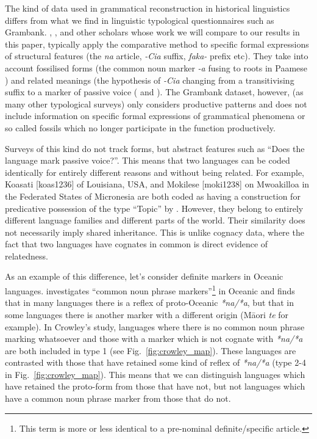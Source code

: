 \documentclass[a4paper,10pt]{article} %
\begin{document}
The kind of data used in grammatical reconstruction in historical linguistics differs from what we find in linguistic typological questionnaires such as Grambank. \citet{crowley1985common}, \citet{clark1976aspects}, and other scholars whose work we will compare to our results in this paper, typically apply the comparative method to specific formal expressions of structural features (the \emph{na} article, \emph{-Cia} suffix, \emph{faka-} prefix etc). They take into account fossilised forms (the common noun marker \emph{-a} fusing to roots in Paamese \citep[141]{crowley1985common}) and related meanings (the hypothesis of \emph{-Cia} changing from a transitivising suffix to a marker of passive voice (\citet{hale_1968, hohepa_1967, hohepa_1969, chung1978} and \citet{jonsson1998}). The Grambank dataset, however, (as many other typological surveys) only considers productive patterns and does not include information on specific formal expressions of grammatical phenomena or so called fossils which no longer participate in the function productively.

Surveys of this kind do not track forms, but abstract features such as ``Does the language mark passive voice?''. This means that two languages can be coded identically for entirely different reasons and without being related. For example, Koasati [koas1236] of Louisiana, USA, and Mokilese [moki1238] on Mwoakilloa in the Federated States of Micronesia are both coded as having a construction for predicative possession of the type ``Topic'' by \citet{wals-2011-117}. However, they belong to entirely different language families and different parts of the world. Their similarity does not necessarily imply shared inheritance. This is unlike cognacy data, where the fact that two languages have cognates in common is direct evidence of relatedness.

As an example of this difference, let's consider definite markers in Oceanic languages. \citet{crowley1985common} investigates ``common noun phrase markers''\footnote{This term is more or less identical to a pre-nominal definite/specific article.} in Oceanic and finds that in many languages there is a reflex of proto-Oceanic \emph{*na/*a}, but that in some languages there is another marker with a different origin (M\={a}ori \emph{te} for example). In Crowley's study, languages where there is no common noun phrase marking whatsoever and those with a marker which is not cognate with \emph{*na/*a} are both included in type 1 (see Fig.~\ref{fig:crowley_map}). These languages are contrasted with those that have retained some kind of reflex of \emph{*na/*a} (type 2-4 in Fig.~\ref{fig:crowley_map}). This means that we can distinguish languages which have retained the proto-form from those that have not, but not languages which have a common noun phrase marker from those that do not.
\end{document}
